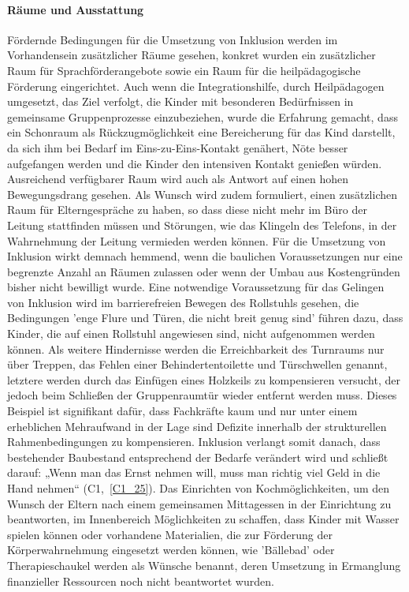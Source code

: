 \paragraph{Räume und Ausstattung}
Fördernde Bedingungen für die Umsetzung von Inklusion werden im Vorhandensein zusätzlicher Räume gesehen, konkret wurden ein zusätzlicher Raum für Sprachförderangebote sowie ein Raum für die heilpädagogische Förderung eingerichtet. Auch wenn die Integrationshilfe, durch Heilpädagogen umgesetzt, das Ziel verfolgt, die Kinder mit besonderen Bedürfnissen in gemeinsame Gruppenprozesse einzubeziehen, wurde die Erfahrung gemacht, dass ein Schonraum als Rückzugmöglichkeit eine Bereicherung für das Kind darstellt, da sich ihm bei Bedarf im Eins-zu-Eins-Kontakt genähert, Nöte besser aufgefangen werden und die Kinder den intensiven Kontakt genießen würden. Ausreichend verfügbarer Raum wird auch als Antwort auf einen hohen Bewegungsdrang gesehen. Als Wunsch wird zudem formuliert, einen zusätzlichen Raum für Elterngespräche zu haben, so dass diese nicht mehr im Büro der Leitung stattfinden müssen und Störungen, wie das Klingeln des Telefons, in der Wahrnehmung der Leitung vermieden werden können. 
Für die Umsetzung von Inklusion wirkt demnach hemmend, wenn die baulichen Voraussetzungen  nur eine begrenzte Anzahl an Räumen zulassen oder wenn der Umbau aus Kostengründen bisher nicht bewilligt wurde. Eine notwendige Voraussetzung für das Gelingen von Inklusion wird im  barrierefreien Bewegen des Rollstuhls gesehen, die Bedingungen 'enge Flure und Türen, die nicht breit genug sind' führen dazu, dass Kinder, die auf einen Rollstuhl angewiesen sind, nicht aufgenommen werden können. Als weitere Hindernisse werden die Erreichbarkeit des Turnraums nur über Treppen, das Fehlen einer Behindertentoilette und Türschwellen genannt, letztere werden  durch das Einfügen eines Holzkeils zu kompensieren versucht, der jedoch beim Schließen der Gruppenraumtür wieder entfernt werden muss. Dieses Beispiel ist signifikant dafür, dass Fachkräfte kaum und nur unter einem erheblichen Mehraufwand in der Lage sind Defizite innerhalb der strukturellen Rahmenbedingungen zu kompensieren.
Inklusion verlangt somit danach, dass bestehender Baubestand entsprechend der Bedarfe verändert wird und schließt darauf: „Wenn man das Ernst nehmen will, muss man richtig viel Geld in die Hand nehmen“ (C1,~\ref{C1_25}). Das Einrichten von Kochmöglichkeiten, um den Wunsch der Eltern nach einem gemeinsamen Mittagessen in der Einrichtung zu beantworten, im Innenbereich Möglichkeiten zu schaffen, dass Kinder mit Wasser spielen können oder vorhandene Materialien, die zur Förderung der Körperwahrnehmung eingesetzt werden können, wie 'Bällebad' oder Therapieschaukel werden als Wünsche benannt, deren Umsetzung in Ermanglung finanzieller Ressourcen noch nicht beantwortet wurden. 
 
